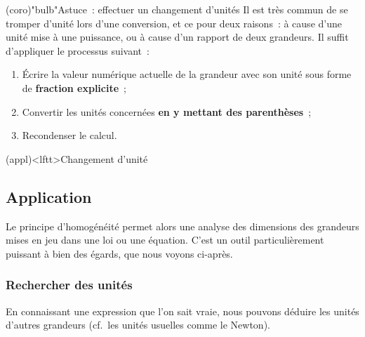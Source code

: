 \documentclass[../../main/main.tex]{subfiles}
\begin{document}
\begin{tcn}(coro)"bulb"{Astuce~: effectuer un changement d'unités}
	Il est très commun de se tromper d'unité lors d'une conversion, et ce pour
	deux raisons~: à cause d'une unité mise à une puissance, ou à cause d'un
	rapport de deux grandeurs. Il suffit d'appliquer le processus suivant~:
	\begin{enumerate}
		\item Écrire la valeur numérique actuelle de la grandeur avec son unité sous
		      forme de \textbf{fraction explicite}~;
		\item Convertir les unités concernées \textbf{en y mettant des
			      parenthèses}~;
		\item Recondenser le calcul.
	\end{enumerate}
\end{tcn}

\begin{tcb*}[sidebyside, lefthand ratio=.55](appl)<lftt>{Changement d'unité}
	\vspace*{-10pt}
	\vspace*{-10pt}
	\tcblower
	\vspace*{-10pt}
\end{tcb*}

\subsection{Application}

Le principe d'homogénéité permet alors une analyse des dimensions des grandeurs
mises en jeu dans une loi ou une équation. C'est un outil particulièrement
puissant à bien des égards, que nous voyons ci-après.

\subsubsection{Rechercher des unités}

En connaissant une expression que l'on sait vraie, nous pouvons déduire les
unités d'autres grandeurs (cf.\ les unités usuelles comme le Newton).
\end{document}
